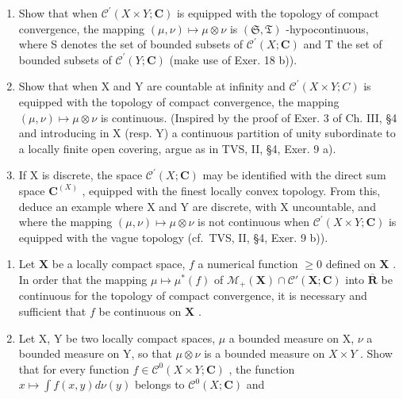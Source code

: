 \begin{enumerate}
\def\labelenumi{\alph{enumi})}
\item
  Show that when \(\mathcal{C}^{\prime}(X\times Y;\mathbf{C})\) is equipped with the topology of compact convergence, the mapping \((\mu,\nu)\mapsto\mu\otimes\nu\) is \((\mathfrak{S},\mathfrak{T})\) -hypocontinuous, where S denotes the set of bounded subsets of \(\mathcal{C}^{\prime}(X;\mathbf{C})\) and T the set of bounded subsets of \(\mathcal{C}^{\prime}(Y;\mathbf{C})\) (make use of Exer. 18 b)).
\item
  Show that when X and Y are countable at infinity and \(\mathcal{C}^{\prime}(X\times Y;C)\) is equipped with the topology of compact convergence, the mapping \((\mu,\nu)\mapsto\mu\otimes\nu\) is continuous. (Inspired by the proof of Exer. 3 of Ch. III, §4 and introducing in X (resp. Y) a continuous partition of unity subordinate to a locally finite open covering, argue as in TVS, II, §4, Exer. 9 a).
\item
  If X is discrete, the space \(\mathcal{C}^{\prime}(X;\mathbf{C})\) may be identified with the direct sum space \(\mathbf{C}^{(X)}\) , equipped with the finest locally convex topology. From this, deduce an example where X and Y are discrete, with X uncountable, and where the mapping \((\mu,\nu)\mapsto\mu\otimes\nu\) is not continuous when \(\mathcal{C}^{\prime}(X\times Y;\mathbf{C})\) is equipped with the vague topology (cf.~TVS, II, §4, Exer. 9 b)).
\end{enumerate}

\begin{enumerate}
\def\labelenumi{\arabic{enumi})}
\setcounter{enumi}{20}
\item
  Let \(\mathbf{X}\) be a locally compact space, \(f\) a numerical function \(\geqslant 0\) defined on \(\mathbf{X}\) . In order that the mapping \(\mu \mapsto \mu^{*}(f)\) of \(\mathcal{M}_{+}(\mathbf{X}) \cap \mathcal{C}'(\mathbf{X};\mathbf{C})\) into \(\overline{\mathbf{R}}\) be continuous for the topology of compact convergence, it is necessary and sufficient that \(f\) be continuous on \(\mathbf{X}\) .
\item
  Let X, Y be two locally compact spaces, \(\mu\) a bounded measure on X, \(\nu\) a bounded measure on Y, so that \(\mu \otimes \nu\) is a bounded measure on \(X \times Y\) . Show that for every function \(f \in \mathcal{C}^{0}(X \times Y; \mathbf{C})\) , the function \(x \mapsto \int f(x, y) d\nu(y)\) belongs to \(\mathcal{C}^{0}(X; \mathbf{C})\) and
\end{enumerate}

